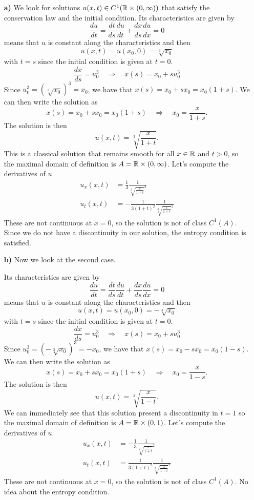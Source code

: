 \begin{enumerate}
    \item[\textbf{a)}] We look for solutions \(u(x, t) \in C^1(\mathbb{R} \times (0, \infty))\) that satisfy the conservation law and the initial condition. 
    Its characteristics are given by
    \[
        \frac{du}{dt} = \frac{dt}{ds} \frac{du}{dt} + \frac{dx}{ds} \frac{du}{dx} = 0
    \]
    means that \(u\) is constant along the characteristics and then 
    \[
        u(x,t) = u(x_0,0) = \sqrt[3]{x_0} 
    \]
    with \(t=s\) since the initial condition is given at \(t=0\). 
    \[
        \frac{dx}{ds} = u_0^3 \quad \Rightarrow \quad x(s) = x_0 + s u_0^3
    \]
    Since \(u_0^3 = (\sqrt[3]{x_0})^3 = x_0\), we have that \(x(s) = x_0 + s x_0 = x_0(1+s)\). We can then write the solution as 
    \[
        x(s) = x_0 + s x_0 = x_0(1+s) \quad \Rightarrow \quad x_0 = \frac{x}{1+s}.
    \]
    The solution is then
    \[
        u(x,t) = \sqrt[3]{\frac{x}{1+t}}.
    \]
    This is a classical solution that remains smooth for all \(x \in \mathbb{R}\) and \(t > 0\), so the maximal domain of definition is \(A = \mathbb{R} \times (0, \infty)\). Let's compute the derivatives of \(u\)
        \begin{align*}
            u_x(x,t) &= \frac{1}{3} \frac{1}{\sqrt[2]{\frac{x}{1+t}}^2} \\
            u_t(x,t) &= -\frac{1}{3(1+t)^2} \frac{1}{\sqrt[3]{\frac{x}{1+t}}^2}
        \end{align*}
    These are not continuous at \(x=0\), so the solution is not of class \(C^1(A)\). Since we do not have a discontinuity in our solution, the entropy condition is satisfied.
    \item[\textbf{b)}] Now we look at the second case.
    
    Its characteristics are given by
    \[
        \frac{du}{dt} = \frac{dt}{ds} \frac{du}{dt} + \frac{dx}{ds} \frac{du}{dx} = 0
    \]
    means that \(u\) is constant along the characteristics and then 
    \[
        u(x,t) = u(x_0,0) = -\sqrt[3]{x_0} 
    \]
    with \(t=s\) since the initial condition is given at \(t=0\). 
    \[
        \frac{dx}{ds} = u_0^3 \quad \Rightarrow \quad x(s) = x_0 + s u_0^3
    \]
    Since \(u_0^3 = (-\sqrt[3]{x_0})^3 = -x_0\), we have that \(x(s) = x_0 - s x_0 = x_0(1-s)\). We can then write the solution as 
    \[
        x(s) = x_0 + s x_0 = x_0(1+s) \quad \Rightarrow \quad x_0 = \frac{x}{1-s}.
    \]
    The solution is then
    \[
        u(x,t) = \sqrt[3]{\frac{x}{1-t}}.
    \]
    We can immediately see that this solution present a discontinuity in \(t=1\) so the maximal domain of definition is \(A = \mathbb{R} \times (0, 1)\). Let's compute the derivatives of \(u\)
        \begin{align*}
            u_x(x,t) &= -\frac{1}{3} \frac{1}{\sqrt[2]{\frac{x}{1+t}}^2} \\
            u_t(x,t) &= \frac{1}{3(1+t)^2} \frac{1}{\sqrt[3]{\frac{x}{1+t}}^2}
        \end{align*}
    These are not continuous at \(x=0\), so the solution is not of class \(C^1(A)\). No idea about the entropy condition.
    \end{enumerate}

